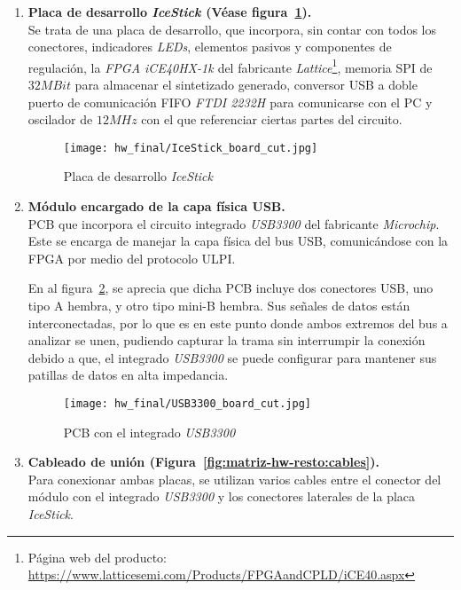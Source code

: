\begin{enumerate}
    \item \textbf{Placa de desarrollo \emph{IceStick \cite{icestickmanual}} (Véase figura~\ref{fig:IceStick_board}).} \\
    Se trata de una placa de desarrollo, que incorpora, sin contar con todos los conectores, indicadores \emph{LEDs}, elementos pasivos y componentes de regulación, la \emph{FPGA iCE40HX-1k \cite{lattice:ice40}} del fabricante \emph{Lattice}\footnote{Página web del producto: \url{https://www.latticesemi.com/Products/FPGAandCPLD/iCE40.aspx}}, memoria SPI de $32MBit$ para almacenar el sintetizado generado, conversor USB a doble puerto de comunicación FIFO \emph{FTDI 2232H \cite{FTDI:FT2232HL}} para comunicarse con el PC y oscilador de $12MHz$ con el que referenciar ciertas partes del circuito.
    
    \begin{figure}[htbp]
        \centering
        \texttt{[image: hw\_final/IceStick\_board\_cut.jpg]}
        \caption{Placa de desarrollo \emph{IceStick}}
        \label{fig:IceStick_board}
    \end{figure}

    \item \textbf{Módulo encargado de la capa física USB.} \\
    PCB que incorpora el circuito integrado \emph{USB3300\cite{icestickmanual}} del fabricante \emph{Microchip}. Este se encarga de manejar la capa física del bus USB, comunicándose con la FPGA por medio del protocolo ULPI\cite{ulpi-specs}.

    En al figura~\ref{fig:USB3300_board}, se aprecia que dicha PCB incluye dos conectores USB, uno tipo A hembra, y otro tipo mini-B hembra. Sus señales de datos están interconectadas, por lo que es en este punto donde ambos extremos del bus a analizar se unen, pudiendo capturar la trama sin interrumpir la conexión debido a que, el integrado \emph{USB3300} se puede configurar para mantener sus patillas de datos en alta impedancia.

    \begin{figure}[htbp]
        \centering
        \texttt{[image: hw\_final/USB3300\_board\_cut.jpg]}
        \caption{PCB con el integrado \emph{USB3300}}
        \label{fig:USB3300_board}
    \end{figure}

    \item \textbf{Cableado de unión (Figura~\ref{fig:matriz-hw-resto:cables}).} \\
    Para conexionar ambas placas, se utilizan varios cables entre el conector del módulo con el integrado \emph{USB3300} y los conectores laterales de la placa \emph{IceStick}.


\end{enumerate}
